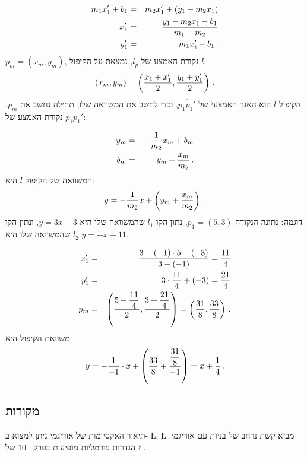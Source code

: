 \begin{eqnarray*}
m_1x_1'+b_1&=&m_2x_1'+(y_1-m_2x_1)\\
x_1'&=&\displaystyle\frac{y_1-m_2x_1-b_1}{m_1-m_2}\\
y_1'&=&m_1x_i'+b_1\,.
\end{eqnarray*}
$p_m=(x_m,y_m)$,
נקודת האמצע של
$l_p$,
נמצאת על הקיפול
$l$:
\[
(x_m,y_m)=\left(\displaystyle\frac{x_1+x_1'}{2},\displaystyle\frac{y_1+y_1'}{2}\right)\,.
\]
הקיפול
$l$
הוא האנך האמצעי של 
$\overline{p_1p_1'}$,
וכדי לחשב את המשוואה שלו, תחילה נחשב את
$p_m$,
נקודת האמצע של
$\overline{p_1p_1'}$:

\begin{eqnarray*}
y_m&=&-\displaystyle\frac{1}{m_2}x_m+b_m\\
b_m&=&y_m+\displaystyle\frac{x_m}{m_2}\,.
\end{eqnarray*}
המשוואה של הקיפול
$l$
היא:
\[
y=-\displaystyle\frac{1}{m_2}x+\left(y_m+\displaystyle\frac{x_m}{m_2}\right)\,.
\]
\textbf{דוגמה:}
נתונה הנקודה
$p_1=(5,3)$,
נתון הקו 
$l_1$
שהמשוואה שלו היא
$y=3x-3$,
ונתון הקו
$l_2$
שהמשוואה שלו היא
$y=-x+11$.

\begin{eqnarray*}
x_1'&=&\displaystyle\frac{3-(-1)\cdot 5-(-3)}{3-(-1)}=\displaystyle\frac{11}{4}\\
y_1' &=&3\cdot\displaystyle\frac{11}{4} + (-3)=\displaystyle\frac{21}{4}\\
	p_m&=&\left(\displaystyle\frac{5+\displaystyle\frac{11}{4}}{2},\displaystyle\frac{3+\displaystyle\frac{21}{4}}{2}\right)=\left(\displaystyle\frac{31}{8},\displaystyle\frac{33}{8}\right)\,.
\end{eqnarray*}
משוואת הקיפול היא:
\[
y=-\displaystyle\frac{1}{-1}\cdot x+\left(\displaystyle\frac{33}{8}+\displaystyle\frac{\displaystyle\frac{31}{8}}{-1}\right)=x+\displaystyle\frac{1}{4}\,.
\]




\subsection*{מקורות}


תיאור האקסיומות של אוריגמי ניתן למצוא ב-%
\L{\cite{wiki:hh-axioms}}, \L{\cite{lang}} 
מביא קשת נרחב של בניות עם אוריגמי.
הגדרות פורמליות מופיעות בפרק~
$10$
של
\L{\cite{martin}}.

